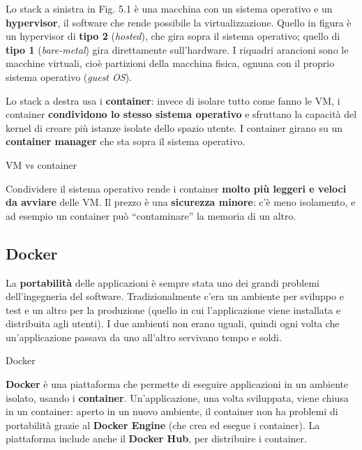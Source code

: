 Lo stack a sinistra in Fig. 5.1 è una macchina con un sistema operativo
e un \textbf{hypervisor}, il software che rende possibile la
virtualizzazione. Quello in figura è un hypervisor di \textbf{tipo 2}
(\emph{hosted}), che gira sopra il sistema operativo; quello di
\textbf{tipo 1} (\emph{bare-metal}) gira direttamente sull'hardware. I
riquadri arancioni sono le macchine virtuali, cioè partizioni della
macchina fisica, ognuna con il proprio sistema operativo (\emph{guest
OS}).

Lo stack a destra usa i \textbf{container}: invece di isolare tutto come
fanno le VM, i container \textbf{condividono lo stesso sistema
operativo} e sfruttano la capacità del kernel di creare più istanze
isolate dello spazio utente. I container girano su un \textbf{container
manager} che sta sopra il sistema operativo.

\begin{boxtip}{VM vs container}

Condividere il sistema operativo rende i container \textbf{molto più
leggeri e veloci da avviare} delle VM. Il prezzo è una \textbf{sicurezza
minore}: c'è meno isolamento, e ad esempio un container può
``contaminare'' la memoria di un altro.

\end{boxtip}

\subsection{Docker}\label{docker}

La \textbf{portabilità} delle applicazioni è sempre stata uno dei grandi
problemi dell'ingegneria del software. Tradizionalmente c'era un
ambiente per sviluppo e test e un altro per la produzione (quello in cui
l'applicazione viene installata e distribuita agli utenti). I due
ambienti non erano uguali, quindi ogni volta che un'applicazione passava
da uno all'altro servivano tempo e soldi.

\begin{boxdefinition}{Docker}

\textbf{Docker} è una piattaforma che permette di eseguire applicazioni
in un ambiente isolato, usando i \textbf{container}. Un'applicazione,
una volta sviluppata, viene chiusa in un container: aperto in un nuovo
ambiente, il container non ha problemi di portabilità grazie al
\textbf{Docker Engine} (che crea ed esegue i container). La piattaforma
include anche il \textbf{Docker Hub}, per distribuire i container.

\end{boxdefinition}

